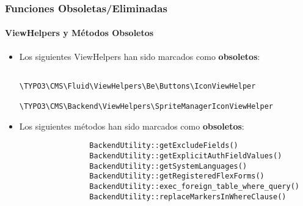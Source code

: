 \begin{frame}[fragile]
	\frametitle{Funciones Obsoletas/Eliminadas}
	\framesubtitle{ViewHelpers y Métodos Obsoletos}


	\begin{itemize}

		\item Los siguientes ViewHelpers han sido marcados como \textbf{obsoletos}:

			\begin{lstlisting}
				\TYPO3\CMS\Fluid\ViewHelpers\Be\Buttons\IconViewHelper
				\TYPO3\CMS\Backend\ViewHelpers\SpriteManagerIconViewHelper
			\end{lstlisting}

		\item Los siguientes métodos han sido marcados como \textbf{obsoletos}:

			\begin{lstlisting}
				BackendUtility::getExcludeFields()
				BackendUtility::getExplicitAuthFieldValues()
				BackendUtility::getSystemLanguages()
				BackendUtility::getRegisteredFlexForms()
				BackendUtility::exec_foreign_table_where_query()
				BackendUtility::replaceMarkersInWhereClause()
			\end{lstlisting}

	\end{itemize}

\end{frame}

